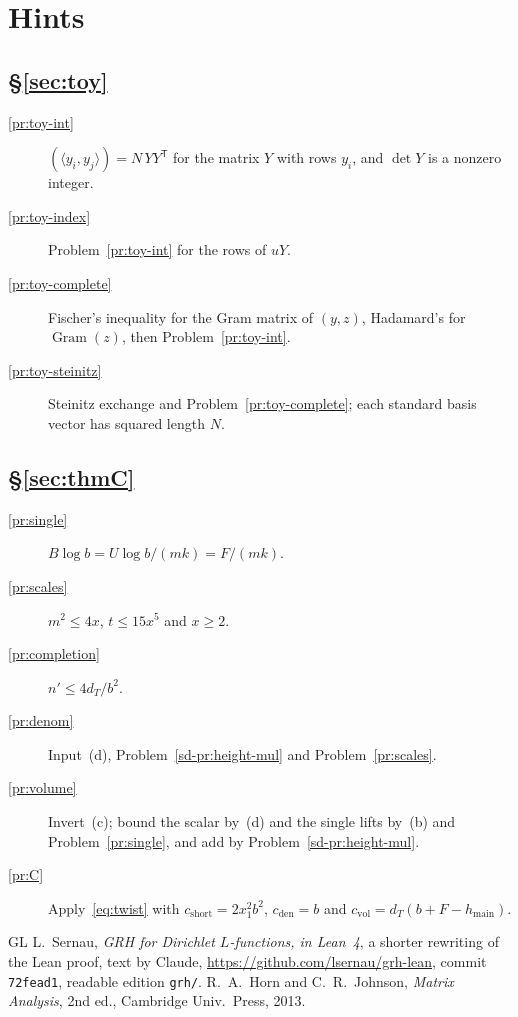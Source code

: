 \documentclass[reqno]{amsart}
\theoremstyle{definition}
\theoremstyle{plain}
\newcommand{\main}{h_{\mathrm{main}}}
\newcommand{\Gram}{\operatorname{Gram}}
\begin{document}
\section*{Hints}

\subsection*{\S\ref{sec:toy}}
\begin{description}
\item[\ref{pr:toy-int}] \((\langle y_i, y_j \rangle) = N\, Y Y^{\mathsf T}\) for the matrix \(Y\) with rows \(y_i\), and \(\det Y\) is a nonzero integer.
\item[\ref{pr:toy-index}] Problem~\ref{pr:toy-int} for the rows of \(uY\).
\item[\ref{pr:toy-complete}] Fischer's inequality for the Gram matrix of \((y, z)\), Hadamard's for \(\Gram(z)\), then Problem~\ref{pr:toy-int}.
\item[\ref{pr:toy-steinitz}] Steinitz exchange and Problem~\ref{pr:toy-complete}; each standard basis vector has squared length \(N\).
\end{description}

\subsection*{\S\ref{sec:thmC}}
\begin{description}

\item[\ref{pr:single}] \(B\log b = U\log b/(mk) = F/(mk)\).
\item[\ref{pr:scales}] \(m^2 \le 4x\), \(t \le 15x^5\) and \(x \ge 2\).
\item[\ref{pr:completion}] \(n' \le 4d_T/b^2\).
\item[\ref{pr:denom}] Input~(d), Problem~\ref{sd-pr:height-mul} and Problem~\ref{pr:scales}.
\item[\ref{pr:volume}] Invert~(c); bound the scalar by~(d) and the single lifts by~(b) and Problem~\ref{pr:single}, and add by Problem~\ref{sd-pr:height-mul}.
\item[\ref{pr:C}] Apply~\eqref{eq:twist} with \(c_{\mathrm{short}} = 2x_1^2b^2\), \(c_{\mathrm{den}} = b\) and \(c_{\mathrm{vol}} = d_T(b + F - \main)\).
\end{description}

{\small
\begin{thebibliography}{GL}
 L.~Sernau, \emph{GRH for Dirichlet \(L\)-functions, in Lean~4}, a shorter rewriting of the Lean proof, text by Claude, \url{https://github.com/lsernau/grh-lean}, commit \texttt{72fead1}, readable edition \texttt{grh/}.
 R.~A.~Horn and C.~R.~Johnson, \emph{Matrix Analysis}, 2nd ed., Cambridge Univ.\ Press, 2013.
\end{thebibliography}
}
\end{document}
